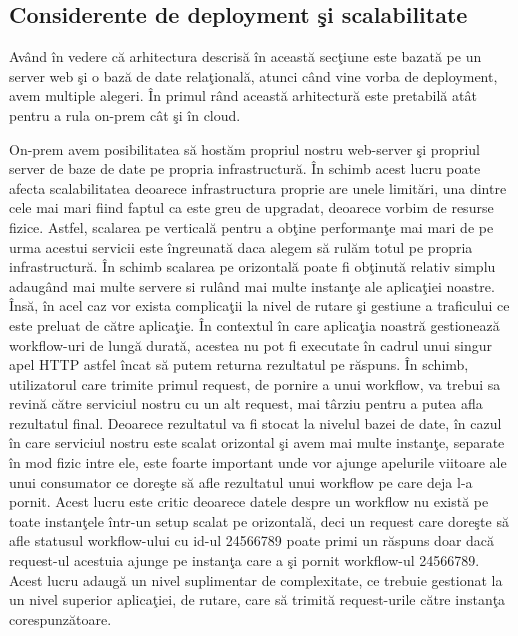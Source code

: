 \documentclass[a4paper,12pt]{report}
\begin{document}
\subsection{Considerente de deployment şi scalabilitate}
\quad Având în vedere că arhitectura descrisă în această secţiune este bazată pe un server web şi o bază de date relaţională, atunci când vine vorba de deployment, avem multiple alegeri. În primul rând această arhitectură este pretabilă atât pentru a rula on-prem cât şi în cloud. 
\par On-prem avem posibilitatea să hostăm propriul nostru web-server şi propriul server de baze de date pe propria infrastructură. În schimb acest lucru poate afecta scalabilitatea deoarece infrastructura proprie are unele limitări, una dintre cele mai mari fiind faptul ca este greu de upgradat, deoarece vorbim de resurse fizice. Astfel, scalarea pe verticală pentru a obţine performanţe mai mari de pe urma acestui servicii este îngreunată daca alegem să rulăm totul pe propria infrastructură. În schimb scalarea pe orizontală poate fi obţinută relativ simplu adaugând mai multe servere si rulând mai multe instanţe ale aplicaţiei noastre. Însă, în acel caz vor exista complicaţii la nivel de rutare şi gestiune a traficului ce este preluat de către aplicaţie. În contextul în care aplicaţia noastră gestionează workflow-uri de lungă durată, acestea nu pot fi executate în cadrul unui singur apel HTTP astfel încat să putem returna rezultatul pe răspuns. În schimb, utilizatorul care trimite primul request, de pornire a unui workflow, va trebui sa revină către serviciul nostru cu un alt request, mai târziu pentru a putea afla rezultatul final. Deoarece rezultatul va fi stocat la nivelul bazei de date, în cazul în care serviciul nostru este scalat orizontal şi avem mai multe instanţe, separate în mod fizic intre ele, este foarte important unde vor ajunge apelurile viitoare ale unui consumator ce doreşte să afle rezultatul unui workflow pe care deja l-a pornit. Acest lucru este critic deoarece datele despre un workflow nu există pe toate instanţele într-un setup scalat pe orizontală, deci un request care doreşte să afle statusul workflow-ului cu id-ul 24566789 poate primi un răspuns doar dacă request-ul acestuia ajunge pe instanţa care a şi pornit workflow-ul 24566789. Acest lucru adaugă un nivel suplimentar de complexitate, ce trebuie gestionat la un nivel superior aplicaţiei, de rutare, care să trimită request-urile către instanţa corespunzătoare.
\end{document}

